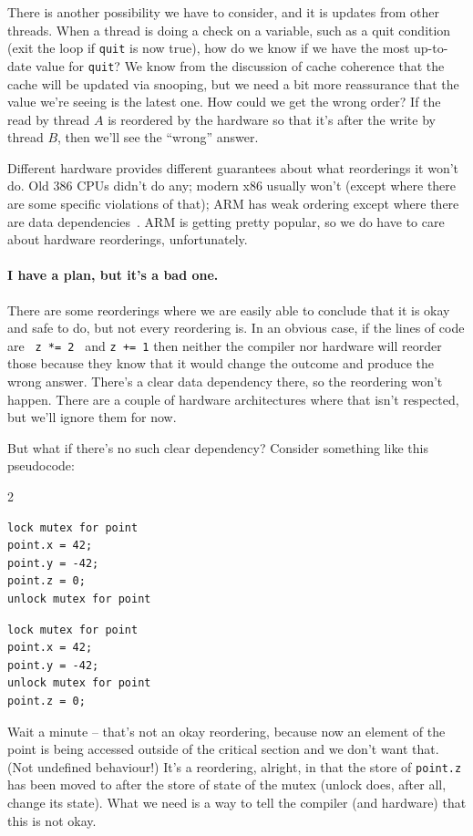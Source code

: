 There is another possibility we have to consider, and it is updates from other threads. When a thread is doing a check on a variable, such as a quit condition (exit the loop if \texttt{quit} is now true), how do we know if we have the most up-to-date value for \texttt{quit}? We know from the discussion of cache coherence that the cache will be updated via snooping, but we need a bit more reassurance that the value we're seeing is the latest one. How could we get the wrong order? If the read by thread $A$ is reordered by the hardware so that it's after the write by thread $B$, then we'll see the ``wrong'' answer. 

Different hardware provides different guarantees about what reorderings it won't do. Old 386 CPUs didn't do any; modern x86 usually won't (except where there are some specific violations of that); ARM has weak ordering except where there are data dependencies~\cite{weakvsstrong}. ARM is getting pretty popular, so we do have to care about hardware reorderings, unfortunately.

\paragraph{I have a plan, but it's a bad one.}

There are some reorderings where we are easily able to conclude that it is okay and safe to do, but not every reordering is. In an obvious case, if the lines of code are \texttt{ z *= 2 } and \texttt{z += 1} then neither the compiler nor hardware will reorder those because they know that it would change the outcome and produce the wrong answer. There's a clear data dependency there, so the reordering won't happen. There are a couple of hardware architectures where that isn't respected, but we'll ignore them for now.

\newpage
But what if there's no such clear dependency? Consider something like this pseudocode:

\begin{multicols}{2}
\begin{verbatim}
lock mutex for point
point.x = 42;
point.y = -42;
point.z = 0;
unlock mutex for point
\end{verbatim}
\columnbreak
\begin{verbatim}
lock mutex for point
point.x = 42;
point.y = -42;
unlock mutex for point
point.z = 0;
\end{verbatim}
\end{multicols}

Wait a minute -- that's not an okay reordering, because now an element of the point is being accessed outside of the critical section and we don't want that. (Not undefined behaviour!) It's a reordering, alright, in that the store of \texttt{point.z} has been moved to after the store of state of the mutex (unlock does, after all, change its state). What we need is a way to tell the compiler (and hardware) that this is not okay.



